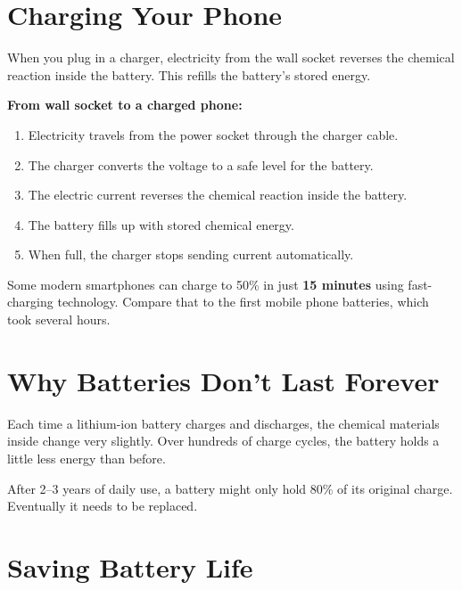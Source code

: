 \sectionrule

\section*{Charging Your Phone}

When you plug in a charger, electricity from the wall socket reverses
the chemical reaction inside the battery.
This refills the battery's stored energy.

\begin{quickmap}
  \textbf{From wall socket to a charged phone:}
  \begin{enumerate}[label=\textbf{\arabic*.}]
    \item Electricity travels from the power socket through the charger cable.
    \item The charger converts the voltage to a safe level for the battery.
    \item The electric current reverses the chemical reaction inside the battery.
    \item The battery fills up with stored chemical energy.
    \item When full, the charger stops sending current automatically.
  \end{enumerate}
\end{quickmap}

\begin{funfact}
  Some modern smartphones can charge to 50\% in just \textbf{15 minutes}
  using fast-charging technology. Compare that to the first mobile phone
  batteries, which took several hours.
\end{funfact}

\sectionrule

\section*{Why Batteries Don't Last Forever}

Each time a lithium-ion battery charges and discharges, the chemical
materials inside change very slightly. Over hundreds of charge cycles,
the battery holds a little less energy than before.

After 2–3 years of daily use, a battery might only hold 80\% of
its original charge. Eventually it needs to be replaced.

\sectionrule

\section*{Saving Battery Life}


